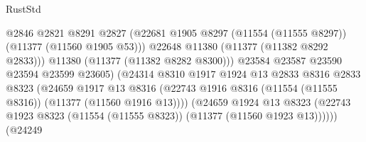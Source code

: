 \begin{lexlean}{RustStd}
\begin{coremodule}
                                              @2846
                                              @2821
                                              @8291
                                              @2827
                                              (@22681
                                                @1905
                                                @8297
                                                (@11554 (@11555 @8297))
                                                (@11377 (@11560 @1905 @53)))
                                              @22648
                                              @11380
                                              (@11377 (@11382 @8292 @2833)))
                                            @11380
                                            (@11377 (@11382 @8282 @8300)))
                                          @23584
                                          @23587
                                          @23590
                                          @23594
                                          @23599
                                          @23605)
                                        (@24314
                                          @8310
                                          @1917
                                          @1924
                                          @13
                                          @2833
                                          @8316
                                          @2833
                                          @8323
                                          (@24659
                                            @1917
                                            @13
                                            @8316
                                            (@22743
                                              @1916
                                              @8316
                                              (@11554 (@11555 @8316))
                                              (@11377 (@11560 @1916 @13))))
                                          (@24659
                                            @1924
                                            @13
                                            @8323
                                            (@22743
                                              @1923
                                              @8323
                                              (@11554 (@11555 @8323))
                                              (@11377 (@11560 @1923 @13))))))
                                      (@24249

\end{coremodule}
\end{lexlean}
